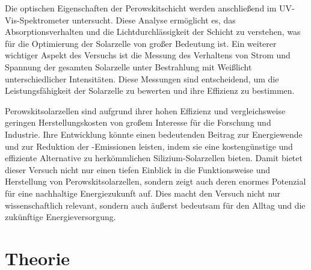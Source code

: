 \documentclass[12pt,a4paper,ngerman]{report}
\begin{document}
Die optischen Eigenschaften der Perowskitschicht werden anschließend im UV-Vis-Spektrometer untersucht. Diese Analyse ermöglicht es, das Absorptionsverhalten und die Lichtdurchlässigkeit der Schicht zu verstehen, was für die Optimierung der Solarzelle von großer Bedeutung ist. Ein weiterer wichtiger Aspekt des Versuchs ist die Messung des Verhaltens von Strom und Spannung der gesamten Solarzelle unter Bestrahlung mit Weißlicht unterschiedlicher Intensitäten. Diese Messungen sind entscheidend, um die Leistungsfähigkeit der Solarzelle zu bewerten und ihre Effizienz zu bestimmen.

Perowskitsolarzellen sind aufgrund ihrer hohen Effizienz und vergleichsweise geringen Herstellungskosten von großem Interesse für die Forschung und Industrie. Ihre Entwicklung könnte einen bedeutenden Beitrag zur Energiewende und zur Reduktion der -Emissionen leisten, indem sie eine kostengünstige und effiziente Alternative zu herkömmlichen Silizium-Solarzellen bieten. Damit bietet dieser Versuch nicht nur einen tiefen Einblick in die Funktionsweise und Herstellung von Perowskitsolarzellen, sondern zeigt auch deren enormes Potenzial für eine nachhaltige Energiezukunft auf. Dies macht den Versuch nicht nur wissenschaftlich relevant, sondern auch äußerst bedeutsam für den Alltag und die zukünftige Energieversorgung.


\chapter{Theorie}
\end{document}
